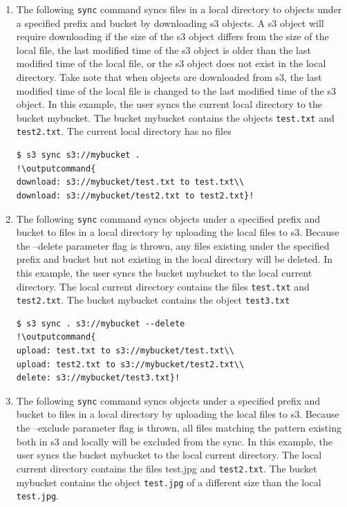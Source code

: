 \documentclass{beamer}
\newcommand{\outputcommand}[1]{\color{darkgreen}{#1}}
\begin{document}
\begin{frame}
\begin{itemize}
\begin{enumerate}
\item The following \texttt{sync} command syncs files in a local directory to objects under a specified prefix and bucket by downloading \acrshort{s3} objects. A \acrshort{s3} object will require downloading if the size of the \acrshort{s3} object differs from the size of the local file, the last modified time of the \acrshort{s3} object is older than the last modified time of the local file, or the \acrshort{s3} object does not exist in the local directory. Take note that when objects are downloaded from \acrshort{s3}, the last modified time of the local file is changed to the last modified time of the \acrshort{s3} object. In this example, the user syncs the current local directory to the bucket mybucket. The bucket mybucket contains the objects \texttt{test.txt} and \texttt{test2.txt}. The current local directory has no files

\lstset{language=shell}
\begin{lstlisting}[escapechar=!]
$ s3 sync s3://mybucket .
!\outputcommand{
download: s3://mybucket/test.txt to test.txt\\
download: s3://mybucket/test2.txt to test2.txt}!
\end{lstlisting}

\item The following \texttt{sync} command syncs objects under a specified prefix and bucket to files in a local directory by uploading the local files to \acrshort{s3}. Because the --delete parameter flag is thrown, any files existing under the specified prefix and bucket but not existing in the local directory will be deleted. In this example, the user syncs the bucket mybucket to the local current directory. The local current directory contains the files \texttt{test.txt} and \texttt{test2.txt}. The bucket mybucket contains the object \texttt{test3.txt}


\lstset{language=shell}
\begin{lstlisting}[escapechar=!]
$ s3 sync . s3://mybucket --delete
!\outputcommand{
upload: test.txt to s3://mybucket/test.txt\\
upload: test2.txt to s3://mybucket/test2.txt\\
delete: s3://mybucket/test3.txt}!
\end{lstlisting}

\item The following \texttt{sync} command syncs objects under a specified prefix and bucket to files in a local directory by uploading the local files to \acrshort{s3}. Because the --exclude parameter flag is thrown, all files matching the pattern existing both in \acrshort{s3} and locally will be excluded from the sync. In this example, the user syncs the bucket mybucket to the local current directory. The local current directory contains the files test.jpg and \texttt{test2.txt}. The bucket mybucket contains the object \texttt{test.jpg} of a different size than the local \texttt{test.jpg}.


\end{enumerate}
\end{itemize}
\end{frame}
\end{document}
